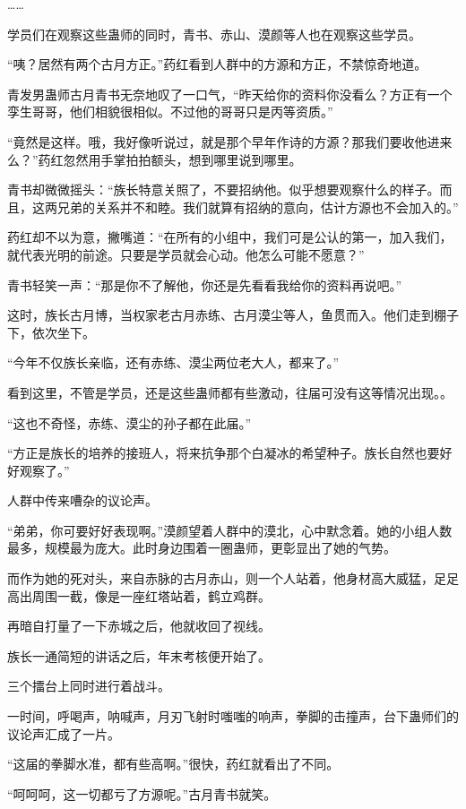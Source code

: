 \begin{this_body}
……

学员们在观察这些蛊师的同时，青书、赤山、漠颜等人也在观察这些学员。

“咦？居然有两个古月方正。”药红看到人群中的方源和方正，不禁惊奇地道。

青发男蛊师古月青书无奈地叹了一口气，“昨天给你的资料你没看么？方正有一个孪生哥哥，他们相貌很相似。不过他的哥哥只是丙等资质。”

“竟然是这样。哦，我好像听说过，就是那个早年作诗的方源？那我们要收他进来么？”药红忽然用手掌拍拍额头，想到哪里说到哪里。

青书却微微摇头：“族长特意关照了，不要招纳他。似乎想要观察什么的样子。而且，这两兄弟的关系并不和睦。我们就算有招纳的意向，估计方源也不会加入的。”

药红却不以为意，撇嘴道：“在所有的小组中，我们可是公认的第一，加入我们，就代表光明的前途。只要是学员就会心动。他怎么可能不愿意？”

青书轻笑一声：“那是你不了解他，你还是先看看我给你的资料再说吧。”

这时，族长古月博，当权家老古月赤练、古月漠尘等人，鱼贯而入。他们走到棚子下，依次坐下。

“今年不仅族长亲临，还有赤练、漠尘两位老大人，都来了。”

看到这里，不管是学员，还是这些蛊师都有些激动，往届可没有这等情况出现。。

“这也不奇怪，赤练、漠尘的孙子都在此届。”

“方正是族长的培养的接班人，将来抗争那个白凝冰的希望种子。族长自然也要好好观察了。”

人群中传来嘈杂的议论声。

“弟弟，你可要好好表现啊。”漠颜望着人群中的漠北，心中默念着。她的小组人数最多，规模最为庞大。此时身边围着一圈蛊师，更彰显出了她的气势。

而作为她的死对头，来自赤脉的古月赤山，则一个人站着，他身材高大威猛，足足高出周围一截，像是一座红塔站着，鹤立鸡群。

再暗自打量了一下赤城之后，他就收回了视线。

族长一通简短的讲话之后，年末考核便开始了。

三个擂台上同时进行着战斗。

一时间，呼喝声，呐喊声，月刃飞射时嗤嗤的响声，拳脚的击撞声，台下蛊师们的议论声汇成了一片。

“这届的拳脚水准，都有些高啊。”很快，药红就看出了不同。

“呵呵呵，这一切都亏了方源呢。”古月青书就笑。


\end{this_body}
